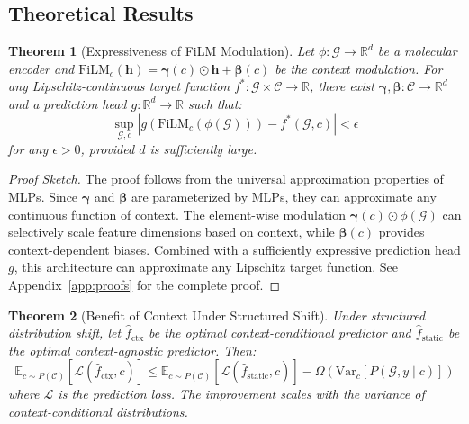 \documentclass[sigconf]{acmart}
\newtheorem{theorem}{Theorem}
\begin{document}
\subsection{Theoretical Results}

\begin{theorem}[Expressiveness of FiLM Modulation]
\label{thm:expressiveness}
Let $\phi: \mathcal{G} \rightarrow \mathbb{R}^d$ be a molecular encoder and $\text{FiLM}_c(\mathbf{h}) = \boldsymbol{\gamma}(c) \odot \mathbf{h} + \boldsymbol{\beta}(c)$ be the context modulation. For any Lipschitz-continuous target function $f^*: \mathcal{G} \times \mathcal{C} \rightarrow \mathbb{R}$, there exist $\boldsymbol{\gamma}, \boldsymbol{\beta}: \mathcal{C} \rightarrow \mathbb{R}^d$ and a prediction head $g: \mathbb{R}^d \rightarrow \mathbb{R}$ such that:
\begin{equation}
    \sup_{\mathcal{G}, c} \left| g(\text{FiLM}_c(\phi(\mathcal{G}))) - f^*(\mathcal{G}, c) \right| < \epsilon
\end{equation}
for any $\epsilon > 0$, provided $d$ is sufficiently large.
\end{theorem}

\begin{proof}[Proof Sketch]
The proof follows from the universal approximation properties of MLPs. Since $\boldsymbol{\gamma}$ and $\boldsymbol{\beta}$ are parameterized by MLPs, they can approximate any continuous function of context. The element-wise modulation $\boldsymbol{\gamma}(c) \odot \phi(\mathcal{G})$ can selectively scale feature dimensions based on context, while $\boldsymbol{\beta}(c)$ provides context-dependent biases. Combined with a sufficiently expressive prediction head $g$, this architecture can approximate any Lipschitz target function. See Appendix~\ref{app:proofs} for the complete proof.
\end{proof}

\begin{theorem}[Benefit of Context Under Structured Shift]
\label{thm:benefit}
Under structured distribution shift, let $\hat{f}_{\text{ctx}}$ be the optimal context-conditional predictor and $\hat{f}_{\text{static}}$ be the optimal context-agnostic predictor. Then:
\begin{equation}
    \mathbb{E}_{c \sim P(\mathcal{C})} \left[ \mathcal{L}(\hat{f}_{\text{ctx}}, c) \right] \leq \mathbb{E}_{c \sim P(\mathcal{C})} \left[ \mathcal{L}(\hat{f}_{\text{static}}, c) \right] - \Omega\left( \mathrm{Var}_c[P(\mathcal{G}, y \mid c)] \right)
\end{equation}
where $\mathcal{L}$ is the prediction loss. The improvement scales with the variance of context-conditional distributions.
\end{theorem}
\end{document}
